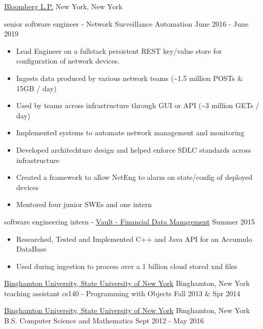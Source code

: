 \documentclass[11pt]{article}
\begin{document}
\headedsection  %
{\href{http://www.bloomberg.com/company}{Bloomberg L.P.}}
{New York, New York}
{
    \headedsubsection
    {senior software engineer - Network Surveillance Automation}
    {June 2016 - June 2019}
    {
        \begin{itemize}
            \item Lead Engineer on a fullstack persistent REST key/value store for configuration of network devices. 
            \item Ingests data produced by various network teams (\textasciitilde{}1.5 million POSTs \& 15GB / day)
            \item Used by teams across infrastructure through GUI or API (\textasciitilde{}3 million GETs / day)
            \item Implemented systems to automate network management and monitoring
            \item Developed architechture design and helped enforce SDLC standards across infrastructure
            \item Created a framework to allow NetEng to alarm on state/config of deployed devices
            \item Mentored four junior SWEs and one intern
        \end{itemize}
    }

    \headedsubsection
    {software engineering intern - \href{https://www.bloomberg.com/professional/product/vault/}{Vault - Financial Data Management}}
    {Summer 2015}
    {
        \begin{itemize}
            \item Researched, Tested and Implemented C++ and Java API for an Accumulo DataBase
            \item Used during ingestion to process over a 1 billion cloud stored xml files
        \end{itemize}
    }
}

\headedsection  %
{\href{http://www.binghamton.edu/index.php}{Binghamton University, State University of New York}}
{Binghamton, New York}
{
    \headedsubsection
    {teaching assistant cs140 - Programming with Objects}
    {Fall 2013 \& Spr 2014}
    {
    }
}

\spacedhrule{0.2em}{0.2em}  %

\headedsection
{\href{http://www.binghamton.edu/index.php}{Binghamton University, State University of New York}}
{Binghamton, New York} {
    \headedsubsection
    {B.S. Computer Science and Mathematics}
    {Sept 2012 - May 2016}
    {}
}
\spacedhrule{0.2em}{0.2em}  %
\end{document}
